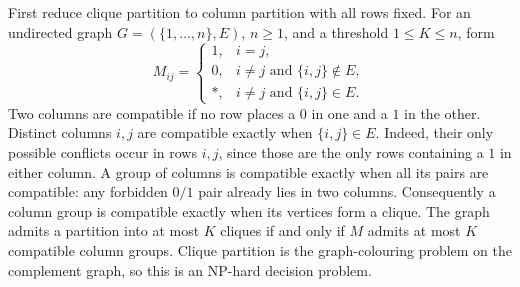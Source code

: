 First reduce clique partition to column partition with all rows fixed.
For an undirected graph \(G=(\{1,\ldots,n\},E)\), \(n\geq1\), and a
threshold \(1\leq K\leq n\), form
\[
 M_{ij}=
 \begin{cases}
  1,&i=j,\\
  0,&i\ne j\text{ and }\{i,j\}\notin E,\\
  *,&i\ne j\text{ and }\{i,j\}\in E.
 \end{cases}
\]
Two columns are compatible if no row places a \(0\) in one and a \(1\)
in the other. Distinct columns \(i,j\) are compatible exactly when
\(\{i,j\}\in E\). Indeed, their only possible conflicts occur in rows
\(i,j\), since those are the only rows containing a \(1\) in either
column. A group of columns is compatible exactly when all its pairs are
compatible: any forbidden \(0/1\) pair already lies in two columns.
Consequently a column group is compatible exactly when its vertices form
a clique. The graph admits a partition into at most \(K\) cliques if and
only if \(M\) admits at most \(K\) compatible column groups. Clique
partition is the graph-colouring problem on the complement graph, so this
is an NP-hard decision problem.

